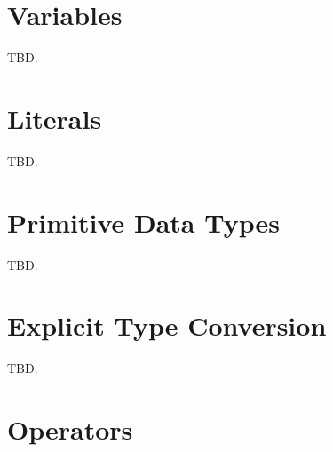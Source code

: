 \section{Variables}
\label{ccik2:svar0}

TBD.



\section{Literals}
\label{ccik2:slit0}

TBD.


\section{Primitive Data Types}
\label{ccik2:ssdt0}

TBD.


\section{Explicit Type Conversion}
\label{ccik2:stcv0}

TBD.


\section{Operators}
\label{ccik2:sops0}

